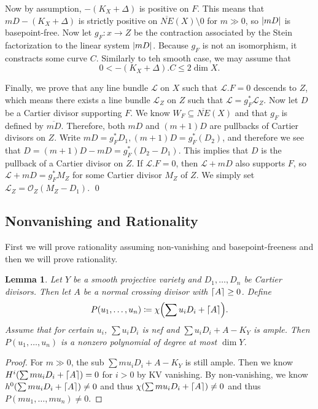 \documentclass[leqno, openany]{memoir}
\DeclarePairedDelimiter{\ceil}{\lceil}{\rceil}
\newtheorem{lem}[thm]{Lemma}
\theoremstyle{definition}
\theoremstyle{remark}
\theoremstyle{plain}
\theoremstyle{definition}
\theoremstyle{remark}
\newcommand{\msc}[1]{\mathscr{#1}}
\newcommand{\ol}[1]{\overline{#1}}
\begin{document}
Now by assumption, $-(K_X + \Delta)$ is positive on $F$. This means that $mD - (K_X + \Delta)$ is strictly positive on $\ol{NE}(X) \setminus \qty{0}$ for $m \gg 0$, so $\abs{mD}$ is basepoint-free. Now let $g_F \colon x \to Z$ be the contraction associated by the Stein factorization to the linear system $\abs{mD}$. Because $g_F$ is not an isomorphism, it constracts some curve $C$. Similarly to teh smooth case, we may assume that
\[ 0 < -(K_X + \Delta).C \leq 2 \dim X. \]

Finally, we prove that any line bundle $\msc{L}$ on $X$ such that $\msc{L}.F = 0$ descends to $Z$, which means there exists a line bundle $\msc{L}_Z$ on $Z$ such that $\msc{L} = g_F^* \msc{L}_Z$. Now let $D$ be a Cartier divisor supporting $F$. We know $W_F \subseteq \ol{NE}(X)$ and that $g_F$ is defined by $\ol{mD}$. Therefore, both $mD$ and $(m+1)D$ are pullbacks of Cartier divisors on $Z$. Write $mD = g_F^* D_1, (m+1)D = g_F^*(D_2)$, and therefore we see that $D = (m+1)D - mD = g_F^* (D_2 - D_1)$. This implies that $D$ is the pullback of a Cartier divisor on $Z$. If $\msc{L}.F = 0$, then $\msc{L} + mD$ also supports $F$, so $\msc{L} + mD = g_F^* M_Z$ for some Cartier divisor $M_Z$ of $Z$. We simply set $\msc{L}_Z = \msc{O}_Z(M_Z - D_1)$. \qed

\subsection{Nonvanishing and Rationality}%
\label{sub:nonvanishing_and_rationality}

First we will prove rationality assuming non-vanishing and basepoint-freeness and then we will prove rationality.

\begin{lem}
    Let $Y$ be a smooth projective variety and $D_1, \ldots, D_n$ be Cartier divisors. Then let $A$ be a normal crossing divisor with $\ceil{A} \geq 0$. Define
    \[ P(u_1, \ldots, u_n) \coloneqq \chi \qty(\sum u_i D_i + \ceil{A}). \]
    Assume that for certain $u_i$, $\sum u_i D_i$ is nef and $\sum u_i D_i + A - K_Y$ is ample. Then $P(u_1, \ldots, u_n)$ is a nonzero polynomial of degree at most $\dim Y$.
\end{lem}

\begin{proof}
    For $m \gg 0$, the sub $\sum m u_i D_i + A - K_Y$ is still ample. Then we know $H^i\qty(\sum m u_i D_i + \ceil{A}) = 0$ for $i > 0$ by KV vanishing. By non-vanishing, we know $h^0\qty(\sum m u_i D_i + \ceil{A}) \neq 0$ and thus $\chi\qty(\sum mu_i D_i + \ceil{A}) \neq 0$ and thus $P(mu_1, \ldots, mu_n) \neq 0$.
\end{proof}
\end{document}
